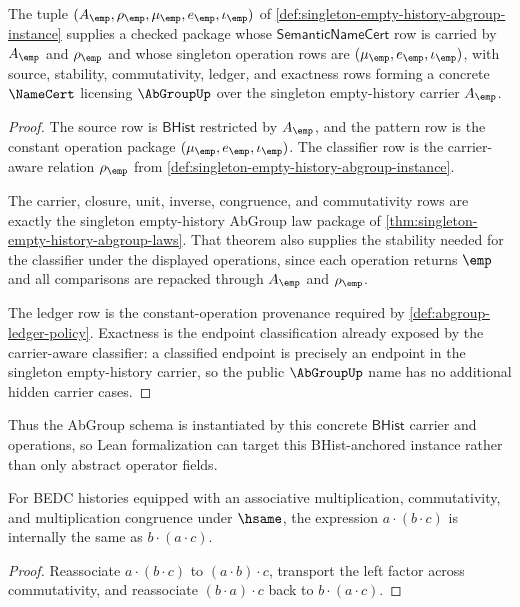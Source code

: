 \begin{theorem}
\label{thm:singleton-empty-history-abgroup-namecert}
The tuple $(A_{\emp},\rho_{\emp},\mu_{\emp},e_{\emp},\iota_{\emp})$ of
\autoref{def:singleton-empty-history-abgroup-instance} supplies a checked
package whose $\mathsf{SemanticNameCert}$ row is carried by
$A_{\emp}$ and $\rho_{\emp}$ and whose singleton operation rows are
$(\mu_{\emp},e_{\emp},\iota_{\emp})$, with source, stability, commutativity,
ledger, and exactness rows forming a concrete $\NameCert$ licensing
$\AbGroupUp$ over the singleton empty-history carrier $A_{\emp}$.
\end{theorem}
\begin{proof}
The source row is $\mathsf{BHist}$ restricted by $A_{\emp}$, and the pattern row
is the constant operation package
$(\mu_{\emp},e_{\emp},\iota_{\emp})$. The classifier row is the carrier-aware
relation $\rho_{\emp}$ from
\autoref{def:singleton-empty-history-abgroup-instance}.

The carrier, closure, unit, inverse, congruence, and commutativity rows are
exactly the singleton empty-history AbGroup law package of
\autoref{thm:singleton-empty-history-abgroup-laws}. That theorem also supplies
the stability needed for the classifier under the displayed operations, since
each operation returns $\emp$ and all comparisons are repacked through
$A_{\emp}$ and $\rho_{\emp}$.

The ledger row is the constant-operation provenance required by
\autoref{def:abgroup-ledger-policy}. Exactness is the endpoint classification
already exposed by the carrier-aware classifier: a classified endpoint is
precisely an endpoint in the singleton empty-history carrier, so the public
$\AbGroupUp$ name has no additional hidden carrier cases.
\end{proof}

Thus the AbGroup schema is instantiated by this concrete $\mathsf{BHist}$
carrier and operations, so Lean formalization can target this BHist-anchored
instance rather than only abstract operator fields.

\begin{theorem}
\label{thm:abgroup-mul-left-right-swap}
For BEDC histories equipped with an associative multiplication, commutativity,
and multiplication congruence under \(\hsame\), the expression
\(a\cdot(b\cdot c)\) is internally the same as \(b\cdot(a\cdot c)\).
\end{theorem}
\begin{proof}
Reassociate \(a\cdot(b\cdot c)\) to \((a\cdot b)\cdot c\), transport the
left factor across commutativity, and reassociate \((b\cdot a)\cdot c\) back to
\(b\cdot(a\cdot c)\).
\end{proof}


